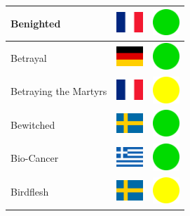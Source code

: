 \documentclass[12pt, a4paper, twoside]{report}
\begin{document}
\begin{center}
\begin{longtable}{|p{5cm}|p{2cm}|p{2cm}|}
 Benighted                                                  & \includegraphics[width=1cm]{../img/flags/fr} &   \includegraphics[width=1cm]{../likes/y} \\ \hline
 Betrayal                                                   & \includegraphics[width=1cm]{../img/flags/de} &   \includegraphics[width=1cm]{../likes/y} \\ \hline
 Betraying the Martyrs                                      & \includegraphics[width=1cm]{../img/flags/fr} &   \includegraphics[width=1cm]{../likes/m} \\ \hline
 Bewitched                                                  & \includegraphics[width=1cm]{../img/flags/se} &   \includegraphics[width=1cm]{../likes/y} \\ \hline
 Bio-Cancer                                                 & \includegraphics[width=1cm]{../img/flags/gr} &   \includegraphics[width=1cm]{../likes/y} \\ \hline
 Birdflesh                                                  & \includegraphics[width=1cm]{../img/flags/se} &   \includegraphics[width=1cm]{../likes/m} \\ \hline

\end{longtable}
\end{center}
\end{document}
